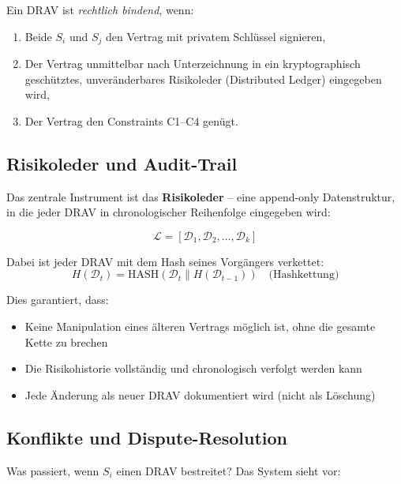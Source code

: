 \documentclass[a4paper, 12pt, twoside, openright]{report}
\theoremstyle{definition}
\theoremstyle{definition}
\begin{document}
Ein DRAV ist \emph{rechtlich bindend}, wenn:
\begin{enumerate}
    \item Beide $S_i$ und $S_j$ den Vertrag mit privatem Schlüssel signieren,
    \item Der Vertrag unmittelbar nach Unterzeichnung in ein kryptographisch geschütztes, unveränderbares Risikoleder (Distributed Ledger) eingegeben wird,
    \item Der Vertrag den Constraints C1--C4 genügt.
\end{enumerate}

\subsection{Risikoleder und Audit-Trail}

Das zentrale Instrument ist das \textbf{Risikoleder} -- eine append-only Datenstruktur, in die jeder DRAV in chronologischer Reihenfolge eingegeben wird:

\begin{equation}
\mathcal{L} = [\mathcal{D}_1, \mathcal{D}_2, \ldots, \mathcal{D}_k]
\end{equation}

Dabei ist jeder DRAV mit dem Hash seines Vorgängers verkettet:
\begin{equation}
H(\mathcal{D}_t) = \text{HASH}(\mathcal{D}_t \| H(\mathcal{D}_{t-1})) \quad \text{(Hashkettung)}
\end{equation}

Dies garantiert, dass:
\begin{itemize}
    \item Keine Manipulation eines älteren Vertrags möglich ist, ohne die gesamte Kette zu brechen
    \item Die Risikohistorie vollständig und chronologisch verfolgt werden kann
    \item Jede Änderung als neuer DRAV dokumentiert wird (nicht als Löschung)
\end{itemize}

\subsection{Konflikte und Dispute-Resolution}

Was passiert, wenn $S_i$ einen DRAV bestreitet? Das System sieht vor:
\end{document}

